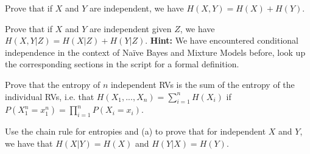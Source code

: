 \documentclass[a4paper,10pt,landscape,twocolumn]{scrartcl}
\begin{document}
\begin{exercise}
\begin{subex}
Prove that if $X$ and $Y$ are independent, we have $H(X,Y)=H(X) + H(Y)$. 
\end{subex}

\begin{subex}
Prove that if $X$ and $Y$ are independent given $Z$, we have $H(X,Y|Z)
= H(X|Z) + H(Y|Z)$. {\bf Hint:} We have encountered conditional
independence in the context of Na{\"i}ve Bayes and Mixture Models
before, look up the corresponding sections in the script for a formal definition.
\end{subex}

\begin{subex}
Prove that the entropy of $n$ independent RVs is the sum of the entropy of the individual RVs, i.e. that  $H(X_1, ..., X_n) = \sum_{i=1}^{n} H(X_{i}) $ if $P(X_1^n=x_1^n) = \prod_{i = 1}^n P(X_i=x_i)$.
\end{subex}

\begin{subex}
Use the chain rule for entropies and (a) to prove that for
  independent $X$ and $Y$, we have that $H(X|Y) = H(X)$ and $H(Y|X) = H(Y)$.
\end{subex}

\end{exercise}
\end{document}
